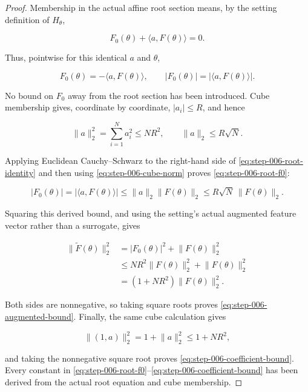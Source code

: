 \begin{proof}
Membership in the actual affine root section means, by the setting definition of
\(H_\theta\),

\begin{equation}
\label{eq:appendix-display-177}
F_0(\theta)+\langle a,F(\theta)\rangle=0.
\end{equation}

Thus, pointwise for this identical \(a\) and \(\theta\),

\begin{equation}
F_0(\theta)=-\langle a,F(\theta)\rangle,
\qquad
\lvert F_0(\theta)\rvert=\lvert\langle a,F(\theta)\rangle\rvert.
\label{eq:step-006-root-identity}
\end{equation}

No bound on \(F_0\) away from the root section has been introduced. Cube membership gives, coordinate by
coordinate, \(\lvert a_i\rvert\leq R\), and hence

\begin{equation}
\lVert a\rVert_2^2=\sum_{i=1}^N a_i^2\leq NR^2,
\qquad
\lVert a\rVert_2\leq R\sqrt N.
\label{eq:step-006-cube-norm}
\end{equation}

Applying Euclidean Cauchy--Schwarz to the right-hand side of
\eqref{eq:step-006-root-identity} and then using
\eqref{eq:step-006-cube-norm} proves
\eqref{eq:step-006-root-f0}:

\begin{equation}
\label{eq:appendix-display-180}
\lvert F_0(\theta)\rvert
=\lvert\langle a,F(\theta)\rangle\rvert
\leq\lVert a\rVert_2\lVert F(\theta)\rVert_2
\leq R\sqrt N\,\lVert F(\theta)\rVert_2.
\end{equation}

Squaring this derived bound, and using the setting's actual augmented feature vector rather than a surrogate,
gives

\begin{equation}
\label{eq:appendix-display-181}
\begin{aligned}
\lVert\widetilde F(\theta)\rVert_2^2
&=\lvert F_0(\theta)\rvert^2+\lVert F(\theta)\rVert_2^2\\
&\leq NR^2\lVert F(\theta)\rVert_2^2+\lVert F(\theta)\rVert_2^2\\
&=(1+NR^2)\lVert F(\theta)\rVert_2^2.
\end{aligned}
\end{equation}

Both sides are nonnegative, so taking square roots proves
\eqref{eq:step-006-augmented-bound}. Finally, the same cube calculation gives

\begin{equation}
\label{eq:appendix-display-182}
\lVert(1,a)\rVert_2^2=1+\lVert a\rVert_2^2\leq1+NR^2,
\end{equation}

and taking the nonnegative square root proves
\eqref{eq:step-006-coefficient-bound}. Every constant in
\eqref{eq:step-006-root-f0}--\eqref{eq:step-006-coefficient-bound} has been derived from the actual
root equation and cube membership. 
\end{proof}

